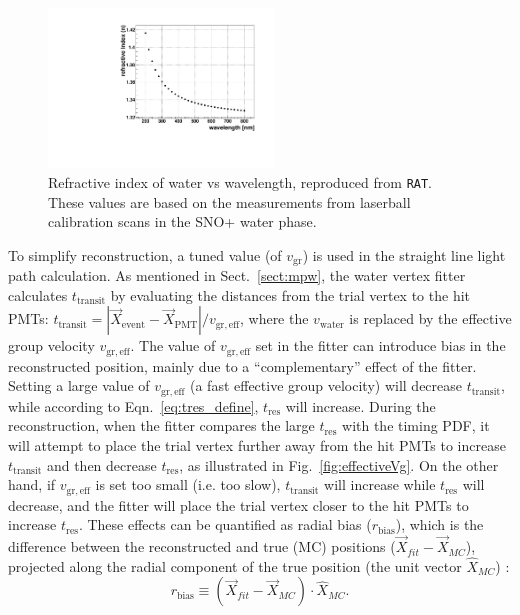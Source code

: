 \begin{figure}[!htb]
	\centering
	\includegraphics[width=6cm]{refractiveIndexVsWavelength.pdf}
	\caption[Refractive index of water vs wavelength.]{Refractive index of water vs wavelength, reproduced from \texttt{RAT}. These values are based on the measurements from laserball calibration scans in the SNO+ water phase\cite{laserball_groupVelocity}.}
	\label{nVsWavelength}
\end{figure}

To simplify reconstruction, a tuned value (of $v_\mathrm{gr}$) is used in the straight line light path calculation. As mentioned in Sect.~\ref{sect:mpw}, the water vertex fitter calculates $t_\mathrm{transit}$ by evaluating the distances from the trial vertex to the hit PMTs: $t_\mathrm{transit}=|\vec{X}_\mathrm{event}-\vec{X}_\mathrm{PMT}|/v_\mathrm{gr,eff}$, where the $v_\mathrm{water}$ is replaced by the effective group velocity $v_\mathrm{gr,eff}$. The value of $v_\mathrm{gr,eff}$ set in the fitter can introduce bias in the reconstructed position, mainly due to a ``complementary'' effect of the fitter. Setting a large value of $v_\mathrm{gr,eff}$ (a fast effective group velocity) will decrease $t_\mathrm{transit}$, while according to Eqn.~\ref{eq:tres_define}, $t_\mathrm{res}$ will increase. During the reconstruction, when the fitter compares the large $t_\mathrm{res}$ with the timing PDF, it will attempt to place the trial vertex further away from the hit PMTs to increase $t_\mathrm{transit}$ and then decrease $t_\mathrm{res}$, as illustrated in Fig.~\ref{fig:effectiveVg}. On the other hand, if $v_\mathrm{gr,eff}$ is set too small (i.e. too slow), $t_\mathrm{transit}$ will increase while $t_\mathrm{res}$ will decrease, and the fitter will place the trial vertex closer to the hit PMTs to increase $t_\mathrm{res}$. These effects can be quantified as radial bias ($r_\mathrm{bias}$), which is the difference between the reconstructed and true (MC) positions ($\vec{X}_{fit}-\vec{X}_{MC}$), projected along the radial component of the true position (the unit vector $\hat{X}_{MC}$) \cite{coulter2013modelling}:
\begin{equation}
r_\mathrm{bias} \equiv (\vec{X}_{fit}-\vec{X}_{MC})\cdot \hat{X}_{MC}.
\end{equation}

